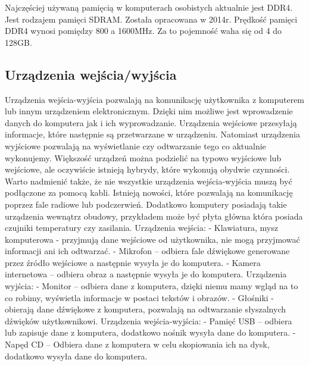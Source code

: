 \documentclass[12pt, a4paper, onside, polish]{article}				%
\begin{document}
Najczęściej używaną pamięcią w komputerach osobistych aktualnie jest DDR4. Jest rodzajem pamięci SDRAM. Została opracowana w 2014r. Prędkość pamięci DDR4 wynosi pomiędzy 800 a 1600MHz. Za to pojemność waha się od 4 do 128GB.  

 
\cleardoublepage

\subsection{Urządzenia wejścia/wyjścia}
\hspace{\parindent}
Urządzenia wejścia-wyjścia pozwalają na komunikację użytkownika z komputerem lub innym urządzeniem elektronicznym. Dzięki nim możliwe jest wprowadzenie danych do komputera jak i ich wyprowadzanie. Urządzenia wejściowe przesyłają informacje, które następnie są przetwarzane w urządzeniu. Natomiast urządzenia wyjściowe pozwalają na wyświetlanie czy odtwarzanie tego co aktualnie wykonujemy. Większość urządzeń można podzielić na typowo wyjściowe lub wejściowe, ale oczywiście istnieją hybrydy, które wykonują obydwie czynności. Warto nadmienić także, że nie wszystkie urządzenia wejścia-wyjścia muszą być podłączone za pomocą kabli. Istnieją nowości, które pozwalają na komunikację poprzez fale radiowe lub podczerwień. Dodatkowo komputery posiadają takie urządzenia wewnątrz obudowy, przykładem może być płyta główna która posiada czujniki temperatury czy zasilania.  \newline\newline
Urządzenia wejścia: \newline
- Klawiatura, mysz komputerowa - przyjmują dane wejściowe od użytkownika, nie mogą przyjmować informacji ani ich odtwarzać. \newline
- Mikrofon – odbiera fale dźwiękowe generowane przez źródło wejściowe a następnie wysyła je do komputera. \newline
- Kamera internetowa – odbiera obraz a następnie wysyła je do komputera. \newline\newline
 Urządzenia wyjścia: \newline
- Monitor – odbiera dane z komputera, dzięki niemu mamy wgląd na to co robimy, wyświetla informacje w postaci tekstów i obrazów. \newline
- Głośniki - obierają dane dźwiękowe z komputera, pozwalają na odtwarzanie słyszalnych dźwięków użytkownikowi. \newline\newline
Urządzenia wejścia-wyjścia: \newline
- Pamięć USB – odbiera lub zapisuje dane z komputera, dodatkowo nośnik wysyła dane do komputera. \newline
- Napęd CD – Odbiera dane z komputera w celu skopiowania ich na dysk, dodatkowo wysyła dane do komputera. \newline
\end{document}
